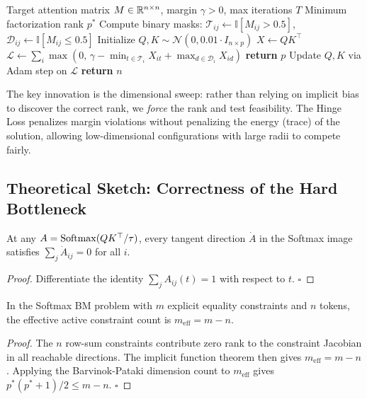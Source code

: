 \begin{algorithm}[H]
  \caption{Hard Bottleneck Margin Rank Predictor}
  \label{alg:hbp}
  \begin{algorithmic}[1]
    \Require Target attention matrix $M \in \mathbb{R}^{n \times n}$, margin $\gamma > 0$,
             max iterations $T$
    \Ensure Minimum factorization rank $p^*$
    \State Compute binary masks: $\mathcal{T}_{ij} \leftarrow \mathbb{I}[M_{ij} > 0.5]$,
           $\mathcal{D}_{ij} \leftarrow \mathbb{I}[M_{ij} \leq 0.5]$
      \State Initialize $Q, K \sim \mathcal{N}(0, 0.01 \cdot I_{n \times p})$
        \State $X \leftarrow QK^\top$
        \State $\mathcal{L} \leftarrow \sum_{i} \max\!\left(0,\, \gamma - \min_{t \in
               \mathcal{T}_i} X_{it} + \max_{d \in \mathcal{D}_i} X_{id}\right)$
          \State \textbf{return} $p$ 
        \EndIf
        \State Update $Q, K$ via Adam step on $\mathcal{L}$
      \EndFor
    \EndFor
    \State \textbf{return} $n$ 
  \end{algorithmic}
\end{algorithm}

The key innovation is the dimensional sweep: rather than relying on implicit bias to discover
the correct rank, we \emph{force} the rank and test feasibility. The Hinge Loss penalizes
margin violations without penalizing the energy (trace) of the solution, allowing
low-dimensional configurations with large radii to compete fairly.

\subsection{Theoretical Sketch: Correctness of the Hard Bottleneck}

\begin{lemma}
  At any $A = \operatorname{Softmax}(QK^\top/\tau)$, every tangent direction $\dot{A}$ in the Softmax
  image satisfies $\sum_j \dot{A}_{ij} = 0$ for all $i$.
\end{lemma}
\begin{proof}
  Differentiate the identity $\sum_j A_{ij}(t) = 1$ with respect to $t$. $\square$
\end{proof}

\begin{lemma}
  In the Softmax BM problem with $m$ explicit equality constraints and $n$ tokens, the
  effective active constraint count is $m_{\text{eff}} = m - n$.
\end{lemma}
\begin{proof}
  The $n$ row-sum constraints contribute zero rank to the constraint
  Jacobian in all reachable directions. The implicit function theorem then gives
  $m_{\text{eff}} = m - n$. Applying the Barvinok-Pataki dimension count to $m_{\text{eff}}$
  gives $p^*(p^*+1)/2 \leq m - n$. $\square$
\end{proof}

